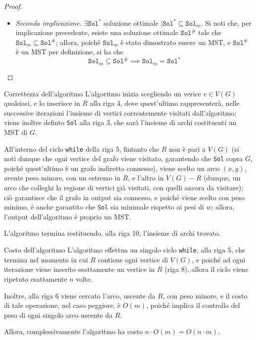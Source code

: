 \documentclass[a4paper, 12pt]{report}
\begin{document}
\begin{proof}
\begin{itemize}
            \item[] \textit{Seconda implicazione.} $\exists \texttt{Sol}^*$ soluzione ottimale $\mid \texttt{Sol}^* \subseteq \texttt{Sol}_m$. Si noti che, per implicazione precedente, esiste una soluzione ottimale $\texttt{Sol}^\#$ tale che $\texttt{Sol}_m \subseteq \texttt{Sol}^\#$; allora, poichè $\texttt{Sol}_m$ è stato dimostrato essere un MST, e $\texttt{Sol}^\#$ è un MST per definizione, si ha che $$\texttt{Sol}_m \subseteq \texttt{Sol}^\# \implies \texttt{Sol}_m = \texttt{Sol}^*$$
        \end{itemize}
    \end{proof}

    \begin{framedobs}{Correttezza dell'algoritmo}
        L'algoritmo inizia scegliendo un verice $v \in V(G)$ qualsiasi, e lo inserisce in $R$ alla riga 4, dove quest'ultimo rappresenterà, nelle successive iterazioni l'insieme di vertici correntemente visitati dall'algoritmo; viene inoltre definto \texttt{Sol} alla riga 3, che sarà l'insieme di archi costituenti un MST di $G$.

        All'interno del ciclo \texttt{while} della riga 5, fintanto che $R$ non è pari a $V(G)$ (si noti dunque che ogni vertice del grafo viene visitato, garantendo che \texttt{Sol} copra $G$, poiché quest'ultimo è un grafo indiretto connesso), viene scelto un arco $(x, y)$, avente peso minore, con un estremo in $R$, e l'altro in $V(G) - R$ (dunque, un arco che colleghi la regione di vertici già visitati, con quelli ancora da visitare); ciò garantisce che il grafo in output sia connesso, e poiché viene scelto con peso minimo, è anche garantito che \texttt{Sol} sia minimale rispetto ai pesi di $w$; allora, l'output dell'algoritmo è proprio un MST.

        L'algoritmo termina restituendo, alla riga 10, l'insieme di archi trovato.
    \end{framedobs}

    \begin{framedobs}{Costo dell'algoritmo}
        L'algoritmo effettua un singolo ciclo \texttt{while}, alla riga 5, che termina nel momento in cui $R$ contiene ogni vertice di $V(G)$, e poiché ad ogni iterazione viene inserito esattamente un vertice in $R$ (riga 8), allora il ciclo viene ripetuto esattamente $n$ volte.

        Inoltre, alla riga 6 viene cercato l'arco, uscente da $R$, con peso minore, e il costo di tale operazione, nel caso peggiore, è $O(m)$, poiché implica il controllo del peso di ogni singolo arco uscente da $R$.

        Allora, complessivamente l'algoritmo ha costo $n \cdot O(m) = O(n \cdot m)$.
    \end{framedobs}
\end{document}
